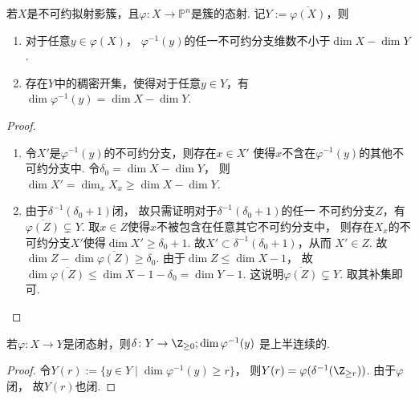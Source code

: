     \begin{corollary}
        若$X$是不可约拟射影簇，且$\varphi\colon X \rightarrow \mathbb{P}^{n}$是簇的态射. 
        记$Y:= \overline{\varphi(X)}$，则
        \begin{enumerate}
            \item[(1)] 对于任意$y \in \varphi(X)$，
                       $\varphi^{-1}(y)$的任一不可约分支维数不小于$\dim X - \dim Y$.
            \item[(2)] 存在$Y$中的稠密开集，使得对于任意$y \in Y$，有
                       $\dim \varphi^{-1}(y) = \dim X - \dim Y$.
        \end{enumerate}
    \end{corollary}
    \begin{proof}
        \begin{enumerate}
            \item[(1)] 令$X'$是$\varphi^{-1}(y)$的不可约分支，则存在$x \in X'$
                       使得$x$不含在$\varphi^{-1}(y)$的其他不可约分支中. 
                       令$\delta_{0} = \dim X - \dim Y$，
                       则$\dim X' = \dim_{x}X_{x} \geq \dim X -\dim Y$.
            \item[(2)] 由于$\delta^{-1}(\delta_{0}+1)$闭，
                       故只需证明对于$\delta^{-1}(\delta_{0}+1)$的任一
                       不可约分支$Z$，有$\overline{\varphi(Z)} \subsetneq Y$.
                       取$x \in Z$使得$x$不被包含在任意其它不可约分支中，
                       则存在$X_{x}$的不可约分支$X'$使得$\dim X' \geq \delta_{0}+1$.
                       故$X' \subset \delta^{-1}(\delta_{0}+1)$，从而
                       $X' \in Z$. 
                       故$\dim Z - \dim \overline{\varphi(Z)} \geq \delta_{0}$.
                       由于$\dim Z \leq \dim X -1$，
                       故$\dim \overline{\varphi(Z)} \leq
                       \dim X - 1 - \delta_{0} = \dim Y -1$.
                       这说明$\overline{\varphi(Z)} \subsetneq Y$. 取其补集即可.\qedhere
        \end{enumerate}
    \end{proof}

    \begin{proposition}
        若$\varphi\colon X \rightarrow Y$是闭态射，则$\delta\colon Y \rightarrow \Z_{\geq 0};\dim \varphi^{-1}(y)$
        是上半连续的.
    \end{proposition}
    \begin{proof}
        令$Y(r):=\{y \in Y \mid \dim \varphi^{-1}(y) \geq r\}$，
        则$Y(r)=\varphi(\delta^{-1}(\Z_{\geq r}))$. 由于$\varphi$闭，
        故$Y(r)$也闭.
    \end{proof}

